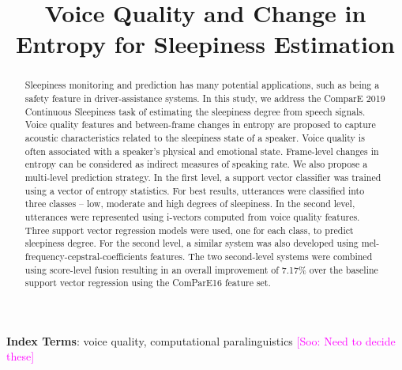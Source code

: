\documentclass[a4paper]{article}
\title{Voice Quality and Change in Entropy for Sleepiness Estimation}
\newcommand{\Soo}[1]{\textcolor{magenta}{[Soo: #1]}}
\begin{document}
\maketitle
% 
\begin{abstract}
Sleepiness monitoring and prediction has many potential applications, such as being a safety feature in driver-assistance systems. In this study, we address the ComparE 2019 Continuous Sleepiness task of estimating the sleepiness degree from speech signals. Voice quality features and between-frame changes in entropy are proposed to capture acoustic characteristics related to the sleepiness state of a speaker. Voice quality is often associated with a speaker's physical and emotional state. Frame-level changes in entropy can be considered as indirect measures of speaking rate. We also propose a multi-level prediction strategy. In the first level, a support vector classifier was trained using a vector of entropy statistics. For best results, utterances were classified into three classes -- low, moderate and high degrees of sleepiness. In the second level, utterances were represented using i-vectors computed from voice quality features. Three support vector regression models were used, one for each class, to predict sleepiness degree. For the second level, a similar system was also developed using mel-frequency-cepstral-coefficients features. The two second-level systems were combined using score-level fusion resulting in an overall improvement of 7.17\% over the baseline support vector regression using the ComParE16 feature set.  
\end{abstract}
\vspace{2mm}

\noindent\textbf{Index Terms}:  voice quality, computational paralinguistics  \Soo{Need to decide these}





\end{document}
